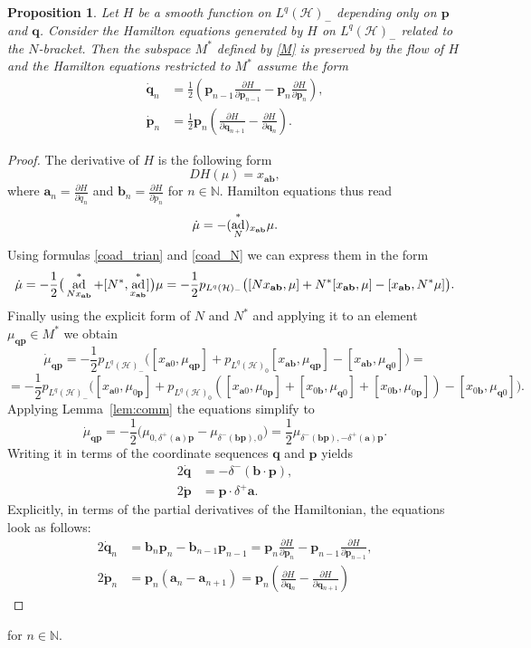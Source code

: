 \documentclass[a4paper,12pt,reqno]{amsart}%
\newtheorem{proposition}[theorem]{Proposition}
\theoremstyle{definition}
\theoremstyle{remark}
\numberwithin{theorem}{section}
\numberwithin{equation}{section}
\newcommand{\1}{{\bf 1}}
\DeclareMathOperator{\ad}{\textnormal{ad}}
\newcommand\N{{\mathbb{N}}}
\renewcommand\a{{\mathbf{a}}}
\renewcommand\b{{\mathbf{b}}}
\newcommand\p{{\mathbf{p}}}
\newcommand\q{{\mathbf{q}}}
\begin{document}
\begin{proposition}
    Let $H$ be a smooth function on $L^q(\mathcal H)_-$ depending only on $\p$ and $\q$. Consider the Hamilton equations generated by $H$ on $L^q(\mathcal H)_-$ related to the $N$-bracket.
 Then the subspace $M^*$ defined by \eqref{M} is preserved by the flow of $H$ and the Hamilton equations restricted to $M^*$ assume the form
\begin{align*}
\dot \q_n &= \frac12\left(\p_{n-1}\frac{\partial H}{\partial \p_{n-1}} - \p_n \frac{\partial H}{\partial \p_n}\right),\\
\dot \p_n &= \frac12 \p_n \left(\frac{\partial H}{\partial \q_{n+1}} - \frac{\partial H}{\partial \q_n}\right).
\end{align*}
\end{proposition}
\begin{proof}
    The derivative of $H$ is the following form
\[
DH(\mu) = x_{\a\b},
\]
where $\a_n = \frac{\partial H}{\partial q_n}$ and $\b_n = \frac{\partial H}{\partial p_n}$ for $n\in\N$. Hamilton equations thus read
\[ 
\dot \mu = -(\ad^*_N)_{x_{\a\b}} \mu .
\]
Using formulas \eqref{coad_trian} and \eqref{coad_N} we can express them in the form
\[
\dot \mu = -\frac12\big(\ad^*_{Nx_{\a\b}} + [N^*,\ad^*_{x_{\a\b}}]\big) \mu = -\frac12 p_{L^q(\mathcal H)_-} \big( [Nx_{\a\b},\mu] + N^*[x_{\a\b},\mu] - [x_{\a\b},N^*\mu] \big).
\]
Finally using the explicit form of $N$ and $N^*$ and applying it to an element $\mu_{\q\p}\in M^*$ we obtain
\[ 
\dot \mu_{\q\p} = -\frac12 p_{L^q(\mathcal H)_-} \big( [x_{\a0},\mu_{\q\p}] + p_{L^q(\mathcal H)_{0}}[x_{\a\b},\mu_{\q\p}] -
[x_{\a\b},\mu_{\q0}]\big) = \]
\[
=-\frac12 p_{L^q(\mathcal H)_-} \big( [x_{\a0},\mu_{0\p}] + p_{L^q(\mathcal H)_{0}}([x_{\a0},\mu_{0\p}] + [x_{0\b},\mu_{\q0}] + [x_{0\b},\mu_{0\p}])-[x_{0\b},\mu_{\q0}]\big).
\]
Applying Lemma~\ref{lem:comm} the equations simplify to
\[ 
\dot \mu_{\q\p} = -\frac12\big( \mu_{0,\delta^+(\a)\p} 
- \mu_{\delta^-(\b\p),0}\big) = \frac12 \mu_{\delta^-(\b\p),-\delta^+(\a)\p}.
\]
Writing it in terms of the coordinate sequences $\q$ and $\p$ yields
  \begin{align*} 
  2\dot \q &= -\delta^-(\b\cdot\p), \\
  2\dot \p &= \p\cdot\delta^+\a.
  \end{align*}
Explicitly, in terms of the partial derivatives of the Hamiltonian, the equations look as follows:
  \begin{align*} 
  2\dot \q_n &= \b_n\p_n - \b_{n-1}\p_{n-1} =  \p_n \frac{\partial H}{\partial \p_n} - \p_{n-1}\frac{\partial H}{\partial \p_{n-1}},\\
  2\dot \p_n &= \p_n(\a_n - \a_{n+1}) = \p_n \left(\frac{\partial H}{\partial \q_n} - \frac{\partial H}{\partial \q_{n+1}}\right)
  \end{align*}
\end{proof}
for $n\in\N$.
\end{document}
